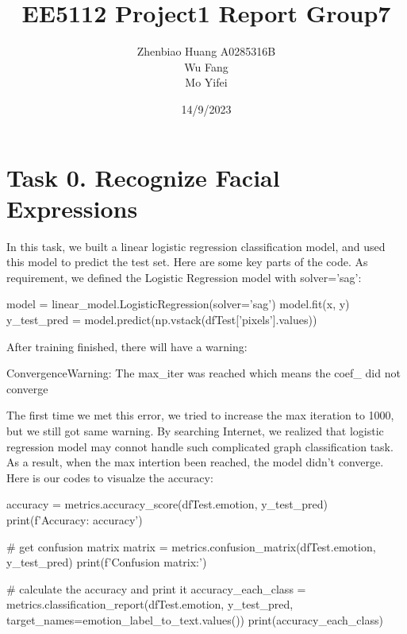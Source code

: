 \documentclass{article}
\title{EE5112 Project1 Report Group7}
\author{Zhenbiao Huang A0285316B \\ Wu Fang \\ Mo Yifei}
\date{14/9/2023}
\begin{document}
 
\maketitle


\tableofcontents

\clearpage
\section{Task 0. Recognize Facial Expressions}\label{sec:task-0.-recognize-facial-expressions}

In this task, we built a linear logistic regression classification model, and used this model to predict the test set.
Here are some key parts of the code.
As requirement, we defined the Logistic Regression model with solver='sag': \par

\begin{python}
model = linear_model.LogisticRegression(solver='sag')
model.fit(x, y)
y_test_pred = model.predict(np.vstack(dfTest['pixels'].values))
\end{python}

After training finished, there will have a warning: \par

\begin{python}
ConvergenceWarning: The max_iter was reached which means the coef_ did not converge
\end{python}

The first time we met this error, we tried to increase the max iteration to 1000, but we still got same warning.
By searching Internet, we realized that logistic regression model may connot handle such complicated graph classification task.
As a result, when the max intertion been reached, the model didn't converge. Here is our codes to visualze the accuracy:\par

\begin{python}
accuracy = metrics.accuracy_score(dfTest.emotion, y_test_pred)
print(f'Accuracy: {accuracy}')

# get confusion matrix
matrix = metrics.confusion_matrix(dfTest.emotion, y_test_pred)
print(f'Confusion matrix:')

# calculate the accuracy and print it
accuracy_each_class = metrics.classification_report(dfTest.emotion, y_test_pred, target_names=emotion_label_to_text.values())
print(accuracy_each_class)
\end{python}
\end{document}
